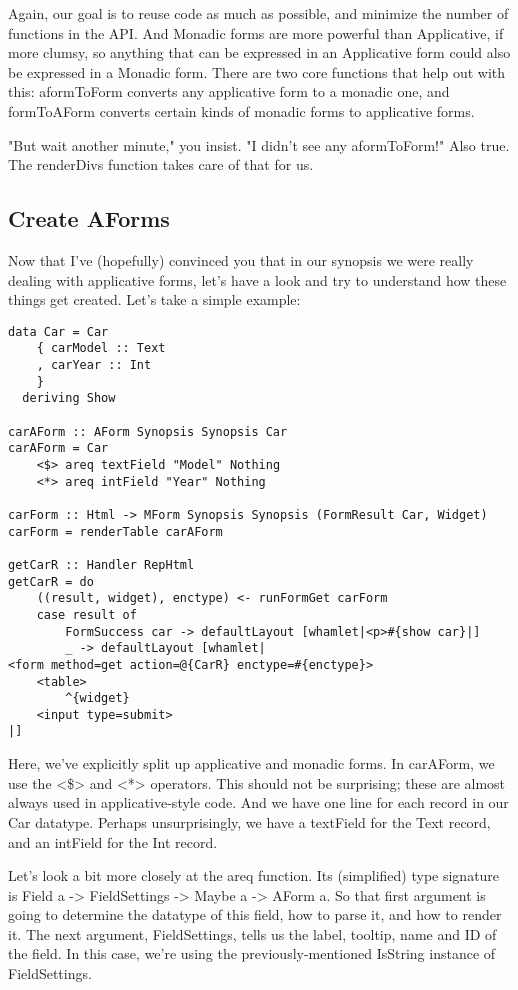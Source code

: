 Again, our goal is to reuse code as much as possible, and minimize the number of functions
in the API. And Monadic forms are more powerful than Applicative, if more clumsy, so
anything that can be expressed in an Applicative form could also be expressed in a Monadic
form. There are two core functions that help out with this: aformToForm converts any
applicative form to a monadic one, and formToAForm converts certain kinds of monadic forms
to applicative forms.

"But wait another minute," you insist. "I didn't see any aformToForm!" Also true. The
renderDivs function takes care of that for us.

\subsection{Create AForms}

Now that I've (hopefully) convinced you that in our synopsis we were really dealing with
applicative forms, let's have a look and try to understand how these things get created.
Let's take a simple example:

\begin{lstlisting}
data Car = Car
    { carModel :: Text
    , carYear :: Int
    }
  deriving Show

carAForm :: AForm Synopsis Synopsis Car
carAForm = Car
    <$> areq textField "Model" Nothing
    <*> areq intField "Year" Nothing

carForm :: Html -> MForm Synopsis Synopsis (FormResult Car, Widget)
carForm = renderTable carAForm

getCarR :: Handler RepHtml
getCarR = do
    ((result, widget), enctype) <- runFormGet carForm
    case result of
        FormSuccess car -> defaultLayout [whamlet|<p>#{show car}|]
        _ -> defaultLayout [whamlet|
<form method=get action=@{CarR} enctype=#{enctype}>
    <table>
        ^{widget}
    <input type=submit>
|]
\end{lstlisting}

Here, we've explicitly split up applicative and monadic forms. In carAForm, we use the
<\$> and <*> operators. This should not be surprising; these are almost always used in
applicative-style code. And we have one line for each record in our Car datatype. Perhaps
unsurprisingly, we have a textField for the Text record, and an intField for the Int
record.

Let's look a bit more closely at the areq function. Its (simplified) type signature is
Field a -> FieldSettings -> Maybe a -> AForm a. So that first argument is going to
determine the datatype of this field, how to parse it, and how to render it. The next
argument, FieldSettings, tells us the label, tooltip, name and ID of the field. In this
case, we're using the previously-mentioned IsString instance of FieldSettings.

